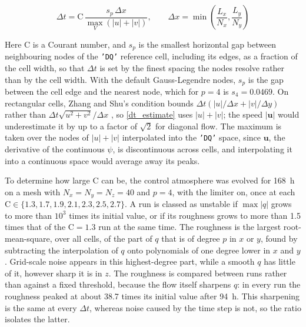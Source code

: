 \documentclass{article}
\begin{document}
\begin{equation}\label{dt_estimate}
    \Delta t = \mathrm{C} \, \frac{s_p \, \Delta x}{\max_V \left( |u| + |v| \right)}, \qquad \Delta x = \min\left( \frac{L_x}{N_x}, \frac{L_y}{N_y} \right)
\end{equation}

Here $\mathrm{C}$ is a Courant number, and $s_p$ is the smallest horizontal gap between neighbouring nodes of the \texttt{'DQ'} reference cell, including its edges, as a fraction of the cell width, so that $\Delta t$ is set by the finest spacing the nodes resolve rather than by the cell width.
With the default Gauss-Legendre nodes, $s_p$ is the gap between the cell edge and the nearest node, which for $p = 4$ is $s_4 = 0.0469$.
On rectangular cells, Zhang and Shu's condition bounds $\Delta t \left( |u| / \Delta x + |v| / \Delta y \right)$ rather than $\Delta t \sqrt{u^2 + v^2} / \Delta x$ \cite{ZhangShu2010}, so \cref{dt_estimate} uses $|u| + |v|$; the speed $|\bm u|$ would underestimate it by up to a factor of $\sqrt{2}$ for diagonal flow.
The maximum is taken over the nodes of $|u| + |v|$ interpolated into the \texttt{'DQ'} space, since $\bm u$, the derivative of the continuous $\psi$, is discontinuous across cells, and interpolating it into a continuous space would average away its peaks.

To determine how large $\mathrm{C}$ can be, the control atmosphere was evolved for \qty{168}{\hour} on a mesh with $N_x = N_y = N_z = 40$ and $p = 4$, with the limiter on, once at each $\mathrm{C} \in \{1.3, 1.7, 1.9, 2.1, 2.3, 2.5, 2.7\}$.
A run is classed as unstable if $\max |q|$ grows to more than $10^3$ times its initial value, or if its roughness grows to more than 1.5 times that of the $\mathrm{C} = 1.3$ run at the same time.
The roughness is the largest root-mean-square, over all cells, of the part of $q$ that is of degree $p$ in $x$ or $y$, found by subtracting the interpolation of $q$ onto polynomials of one degree lower in $x$ and $y$.
Grid-scale noise appears in this highest-degree part, while a smooth $q$ has little of it, however sharp it is in $z$.
The roughness is compared between runs rather than against a fixed threshold, because the flow itself sharpens $q$: in every run the roughness peaked at about 38.7 times its initial value after \qty{94}{\hour}.
This sharpening is the same at every $\Delta t$, whereas noise caused by the time step is not, so the ratio isolates the latter.
\end{document}
